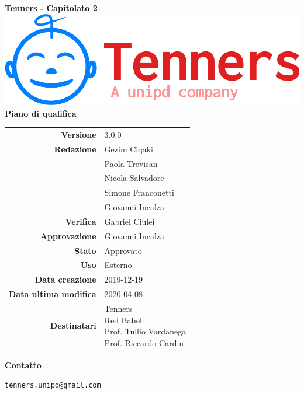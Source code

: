 \begin{titlepage}
	\begin{center}
		\large \textbf{Tenners - Capitolato 2}
		\vfill
		\includegraphics[scale = 0.3]{./res/img/logo.png}\\
		\vfill
		\Huge \textbf{Piano di qualifica}

        \vfill
        \large

        \begin{tabular}{r|l}
                        \textbf{Versione} & 3.0.0 \\
                        \textbf{Redazione} 
                        & Gezim Ciqaki \\
                        & Paola Trevisan \\
                        & Nicola Salvadore \\
                        & Simone Franconetti\\
                        & Giovanni Incalza \\
                        \textbf{Verifica} &
                       	Gabriel Ciulei\\
                        \textbf{Approvazione} & Giovanni Incalza \\
                        \textbf{Stato} & Approvato \\
                        \textbf{Uso} &  Esterno\\
                        \textbf{Data creazione} &  2019-12-19\\
                        \textbf{Data ultima modifica} &  2020-04-08\\
                        \textbf{Destinatari} & \parbox[t]{5cm}{Tenners\\Red Babel\\Prof. Tullio Vardanega\\Prof. Riccardo Cardin}
                \end{tabular}
                \vfill
                \normalsize
                \vfill
                \textbf{Contatto}

                \texttt{tenners.unipd@gmail.com}

	\end{center}
\end{titlepage}
